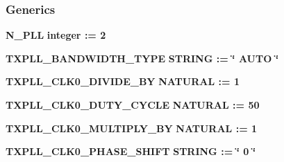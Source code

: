 \subsubsection*{Generics}
 \begin{DoxyCompactItemize}
\item 
{\bf N\+\_\+\+P\+LL} {\bfseries {\bfseries \textcolor{comment}{integer}\textcolor{vhdlchar}{ }\textcolor{vhdlchar}{ }\textcolor{vhdlchar}{\+:}\textcolor{vhdlchar}{=}\textcolor{vhdlchar}{ }\textcolor{vhdlchar}{ } \textcolor{vhdldigit}{2} \textcolor{vhdlchar}{ }}}
\item 
{\bf T\+X\+P\+L\+L\+\_\+\+B\+A\+N\+D\+W\+I\+D\+T\+H\+\_\+\+T\+Y\+PE} {\bfseries {\bfseries \textcolor{comment}{S\+T\+R\+I\+NG}\textcolor{vhdlchar}{ }\textcolor{vhdlchar}{ }\textcolor{vhdlchar}{\+:}\textcolor{vhdlchar}{=}\textcolor{vhdlchar}{ }\textcolor{vhdlchar}{ }\textcolor{vhdlchar}{ }\textcolor{vhdlchar}{ }\textcolor{keyword}{\char`\"{} A\+U\+T\+O \char`\"{}}\textcolor{vhdlchar}{ }}}
\item 
{\bf T\+X\+P\+L\+L\+\_\+\+C\+L\+K0\+\_\+\+D\+I\+V\+I\+D\+E\+\_\+\+BY} {\bfseries {\bfseries \textcolor{comment}{N\+A\+T\+U\+R\+AL}\textcolor{vhdlchar}{ }\textcolor{vhdlchar}{ }\textcolor{vhdlchar}{\+:}\textcolor{vhdlchar}{=}\textcolor{vhdlchar}{ }\textcolor{vhdlchar}{ } \textcolor{vhdldigit}{1} \textcolor{vhdlchar}{ }}}
\item 
{\bf T\+X\+P\+L\+L\+\_\+\+C\+L\+K0\+\_\+\+D\+U\+T\+Y\+\_\+\+C\+Y\+C\+LE} {\bfseries {\bfseries \textcolor{comment}{N\+A\+T\+U\+R\+AL}\textcolor{vhdlchar}{ }\textcolor{vhdlchar}{ }\textcolor{vhdlchar}{\+:}\textcolor{vhdlchar}{=}\textcolor{vhdlchar}{ }\textcolor{vhdlchar}{ } \textcolor{vhdldigit}{50} \textcolor{vhdlchar}{ }}}
\item 
{\bf T\+X\+P\+L\+L\+\_\+\+C\+L\+K0\+\_\+\+M\+U\+L\+T\+I\+P\+L\+Y\+\_\+\+BY} {\bfseries {\bfseries \textcolor{comment}{N\+A\+T\+U\+R\+AL}\textcolor{vhdlchar}{ }\textcolor{vhdlchar}{ }\textcolor{vhdlchar}{\+:}\textcolor{vhdlchar}{=}\textcolor{vhdlchar}{ }\textcolor{vhdlchar}{ } \textcolor{vhdldigit}{1} \textcolor{vhdlchar}{ }}}
\item 
{\bf T\+X\+P\+L\+L\+\_\+\+C\+L\+K0\+\_\+\+P\+H\+A\+S\+E\+\_\+\+S\+H\+I\+FT} {\bfseries {\bfseries \textcolor{comment}{S\+T\+R\+I\+NG}\textcolor{vhdlchar}{ }\textcolor{vhdlchar}{ }\textcolor{vhdlchar}{\+:}\textcolor{vhdlchar}{=}\textcolor{vhdlchar}{ }\textcolor{vhdlchar}{ }\textcolor{vhdlchar}{ }\textcolor{vhdlchar}{ }\textcolor{keyword}{\char`\"{} 0 \char`\"{}}\textcolor{vhdlchar}{ }}}
\item 

\end{DoxyCompactItemize}
